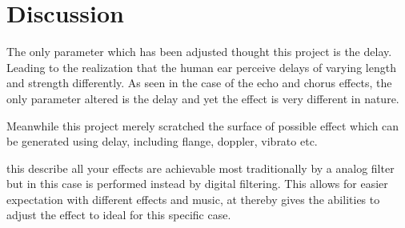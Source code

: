 
\section{Discussion}
The only parameter which has been adjusted thought this project is the delay. Leading to the realization that the human ear perceive delays of varying length and strength differently. As seen in the case of the echo and chorus effects, the only parameter altered is the delay and yet the effect is very different in nature.

Meanwhile this project merely scratched the surface of possible effect which can be generated using delay, including flange, doppler, vibrato etc.     

 

this describe all your effects are achievable most traditionally by a analog filter but in this case is performed instead by digital filtering.
This allows for easier expectation with different effects and music, at thereby gives the abilities to adjust the effect to ideal for this specific case.


